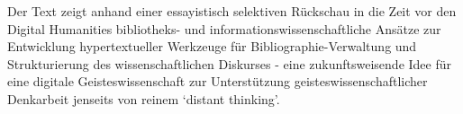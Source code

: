 Der Text zeigt anhand einer essayistisch selektiven Rückschau in die
Zeit vor den Digital Humanities bibliotheks- und
informationswissenschaftliche Ansätze zur Entwicklung hypertextueller
Werkzeuge für Bibliographie-Verwaltung und Strukturierung des
wissenschaftlichen Diskurses - eine zukunftsweisende Idee für eine
digitale Geisteswissenschaft zur Unterstützung geisteswissenschaftlicher
Denkarbeit jenseits von reinem `distant thinking'.
